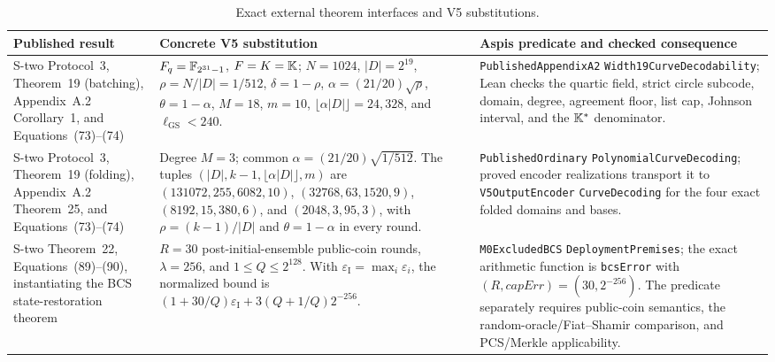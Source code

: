 \begin{table}[h!]
\centering
\scriptsize
\caption{Exact external theorem interfaces and V5 substitutions.}
\label{tab:published-interface-map}
\begin{tabularx}{\textwidth}{@{}R{0.22\textwidth}YR{0.25\textwidth}@{}}
\toprule
Published result & Concrete V5 substitution & Aspis predicate and checked consequence \\
\midrule
S-two Protocol~3, Theorem~19 (batching), Appendix~A.2 Corollary~1, and
Equations~(73)--(74) &
\(F_q=\mathbb{F}_{2^{31}-1}\), \(F=K=\mathbb{K}\); \(N=1024\), \(|D|=2^{19}\),
\(\rho=N/|D|=1/512\), \(\delta=1-\rho\),
\(\alpha=(21/20)\sqrt{\rho}\), \(\theta=1-\alpha\), \(M=18\),
\(m=10\), \(\lfloor\alpha|D|\rfloor=24{,}328\), and
\(\ell_{\mathrm{GS}}<240\). &
\texttt{PublishedAppendixA2}\newline
\texttt{Width19CurveDecodability}; Lean checks the
quartic field, strict circle subcode, domain, degree, agreement floor, list
cap, Johnson interval, and the \(\mathbb{K}^*\) denominator. \\
\addlinespace
S-two Protocol~3, Theorem~19 (folding), Appendix~A.2 Theorem~25, and
Equations~(73)--(74) &
Degree \(M=3\); common \(\alpha=(21/20)\sqrt{1/512}\).  The tuples
\((|D|,k-1,\lfloor\alpha|D|\rfloor,m)\) are
\((131072,255,6082,10)\), \((32768,63,1520,9)\),
\((8192,15,380,6)\), and \((2048,3,95,3)\), with
\(\rho=(k-1)/|D|\) and \(\theta=1-\alpha\) in every round. &
\texttt{PublishedOrdinary}\newline
\texttt{PolynomialCurveDecoding}; proved encoder
realizations transport it to \texttt{V5OutputEncoder}\newline
\texttt{CurveDecoding} for the
four exact folded domains and bases. \\
\addlinespace
S-two Theorem~22, Equations~(89)--(90), instantiating the BCS
state-restoration theorem &
\(R=30\) post-initial-ensemble public-coin rounds, \(\lambda=256\), and
\(1\leq Q\leq2^{128}\).  With
\(\varepsilon_{\mathrm I}=\max_i\varepsilon_i\), the normalized bound is
\((1+30/Q)\varepsilon_{\mathrm I}
 +3(Q+1/Q)2^{-256}\). &
\texttt{M0ExcludedBCS}\newline
\texttt{DeploymentPremises}; the exact arithmetic function is
\texttt{bcsError} with \((R,\mathit{capErr})=(30,2^{-256})\).  The predicate
separately requires public-coin semantics, the random-oracle/Fiat--Shamir
comparison, and PCS/Merkle applicability. \\
\bottomrule
\end{tabularx}
\end{table}


